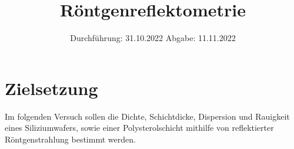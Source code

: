 

\subject{V44}
\title{Röntgenreflektometrie}
\date{
    Durchführung: 31.10.2022
     \hspace{3em}
    Abgabe: 11.11.2022
}


\maketitle
\thispagestyle{empty}
\tableofcontents
\newpage

\section{Zielsetzung}

    Im folgenden Versuch sollen die Dichte,
    Schichtdicke,
    Dispersion und Rauigkeit eines Siliziumwafers,
    sowie einer Polysterolschicht mithilfe von reflektierter Röntgenstrahlung bestimmt werden.


\clearpage


\clearpage


\clearpage


\clearpage

\printbibliography


